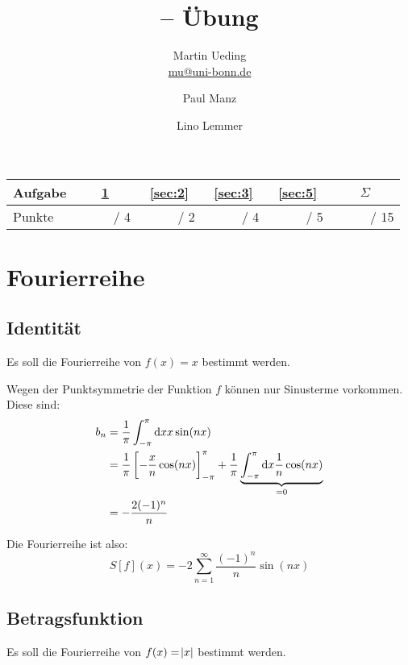 \documentclass[11pt, ngerman]{article}
\title{\themodul{} -- Übung \theuebung \\ \vspace{0.5cm} \large{\thegruppe}}
\author{Martin Ueding \\ \small{\href{mailto:mu@uni-bonn.de}{mu@uni-bonn.de}} \and Paul Manz \and Lino Lemmer}
\newcommand{\punkte}{\textcolor{white}{xxxxx}}
\begin{document}
\maketitle

\begin{table}[h]
	\centering
	\begin{tabular}{l|c|c|c|c|c}
		Aufgabe & \ref{sec:1} & \ref{sec:2} & \ref{sec:3} & \ref{sec:5} & $\Sigma$   \\
		\hline
		Punkte & \punkte / 4 & \punkte / 2 & \punkte / 4 & \punkte / 5 & \punkte / 15
	\end{tabular}
\end{table}



\section{Fourierreihe}

\label{sec:1}

\subsection{Identität}

Es soll die Fourierreihe von $f(x) = x$ bestimmt werden.

Wegen der Punktsymmetrie der Funktion $f$ können nur Sinusterme vorkommen. Diese sind:
\begin{align*}
	b_n
	&= \frac 1\pi \int_{-\pi}^\pi \dif x x \sin(nx) \\
	&= \frac 1\pi \sbr{-\frac xn \cos(nx)}_{-\pi}^\pi + \frac 1\pi \underbrace{\int_{-\pi}^\pi \dif x \frac 1n \cos(nx)}_{=0} \\
	&= - \frac{2 (-1)^n}{n}
\end{align*}

Die Fourierreihe ist also:
\[ S[f](x) = - 2 \sum_{n = 1}^\infty \frac{(-1)^n}{n} \sin(nx) \]

\subsection{Betragsfunktion}

Es soll die Fourierreihe von $f(x) = \abs x$ bestimmt werden.
\end{document}
